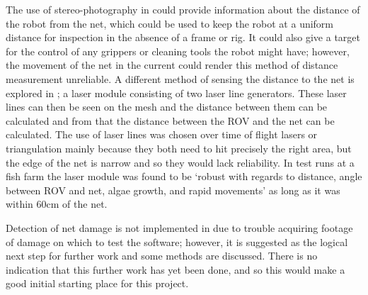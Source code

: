 \documentclass[11.5pt, twoside, a4paper]{article}
\begin{document}
 
The use of stereo-photography in \cite{svane2006test} could provide information about the distance of the robot from the net, which could be used to keep the robot at a uniform distance for inspection in the absence of a frame or rig. It could also give a target for the control of any grippers or cleaning tools the robot might have; however, the movement of the net in the current could render this method of distance measurement unreliable. A different method of sensing the distance to the net is explored in \cite{jakobsen2011automatic}; a laser module consisting of two laser line generators. These laser lines can then be seen on the mesh and the distance between them can be calculated and from that the distance between the ROV and the net can be calculated. The use of laser lines was chosen over time of flight lasers or triangulation mainly because they both need to hit precisely the right area, but the edge of the net is narrow and so they would lack reliability. In test runs at a fish farm the laser module was found to be `robust with regards to distance, angle between ROV and net, algae growth, and rapid movements' \cite{jakobsen2011automatic} as long as it was within 60cm of the net. 

Detection of net damage is not implemented in \cite{jakobsen2011automatic} due to trouble acquiring footage of damage on which to test the software; however, it is suggested as the logical next step for further work and some methods are discussed. There is no indication that this further work has yet been done, and so this would make a good initial starting place for this project. 
\end{document}
